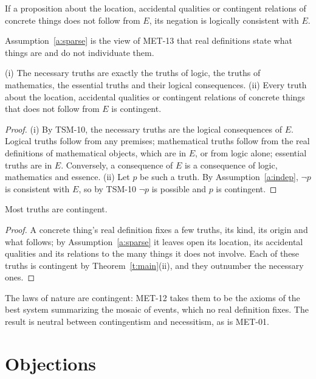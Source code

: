 \documentclass{situationist-preprint}
\begin{document}
\begin{assumption}[Independence]\label{a:indep}
If a proposition about the location, accidental qualities or contingent relations of concrete things does not follow from $E$, its negation is logically consistent with $E$.
\end{assumption}

Assumption~\ref{a:sparse} is the view of MET-13 that real definitions state what things are and do not individuate them.

\begin{theorem}\label{t:main}
\textup{(i)} The necessary truths are exactly the truths of logic, the truths of mathematics, the essential truths and their logical consequences. \textup{(ii)} Every truth about the location, accidental qualities or contingent relations of concrete things that does not follow from $E$ is contingent.
\end{theorem}

\begin{proof}
(i) By TSM-10, the necessary truths are the logical consequences of $E$. Logical truths follow from any premises; mathematical truths follow from the real definitions of mathematical objects, which are in $E$, or from logic alone; essential truths are in $E$. Conversely, a consequence of $E$ is a consequence of logic, mathematics and essence. (ii) Let $p$ be such a truth. By Assumption~\ref{a:indep}, $\neg p$ is consistent with $E$, so by TSM-10 $\neg p$ is possible and $p$ is contingent.
\end{proof}

\begin{corollary}\label{c:most}
Most truths are contingent.
\end{corollary}

\begin{proof}
A concrete thing's real definition fixes a few truths, its kind, its origin and what follows; by Assumption~\ref{a:sparse} it leaves open its location, its accidental qualities and its relations to the many things it does not involve. Each of these truths is contingent by Theorem~\ref{t:main}(ii), and they outnumber the necessary ones.
\end{proof}

The laws of nature are contingent: MET-12 takes them to be the axioms of the best system summarizing the mosaic of events, which no real definition fixes. The result is neutral between contingentism and necessitism, as is MET-01.

\section{Objections}
\end{document}
